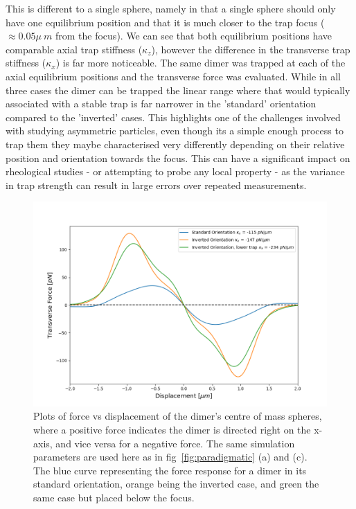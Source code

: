 This is different to a single sphere, namely in that a
single sphere should only have one equilibrium position
and that it is much closer to the trap focus ($\approx
0.05\mu\ m$ from the focus). We can see that both 
equilibrium positions have comparable axial trap 
stiffness ($\kappa_z$), however the difference in the 
transverse trap stiffness ($\kappa_x$) is far more 
noticeable. The same dimer was trapped at each of the 
axial equilibrium positions and the transverse force was 
evaluated. While in all three cases the dimer can be 
trapped the linear range where that would typically 
associated with a stable trap is far narrower in the 
'standard' orientation compared to the 'inverted' cases. 
This highlights one of the challenges involved with 
studying asymmetric particles, even though its a 
simple enough process to trap them they maybe 
characterised very differently depending on their 
relative position and orientation towards the focus. 
This can have a significant impact on rheological 
studies - or attempting to probe any local property 
- as the variance in trap strength can result in 
large errors over repeated measurements. 
\begin{figure}[h!]
	\centering
	\includegraphics[width=\linewidth]{transverse_force.png}
	\caption{Plots of force vs displacement of the dimer's 
		centre of mass spheres, where a positive force 
		indicates the dimer is directed right on the x-axis, 
		and vice versa for a negative force. The same simulation 
		parameters are used here as in fig~\ref{fig:paradigmatic}
		(a) and (c). The blue curve representing the force 
		response for a dimer in its standard orientation, orange 
		being the inverted case, and green the same case but 
		placed below the focus.}
	\label{fig:transverse_force}
\end{figure}

